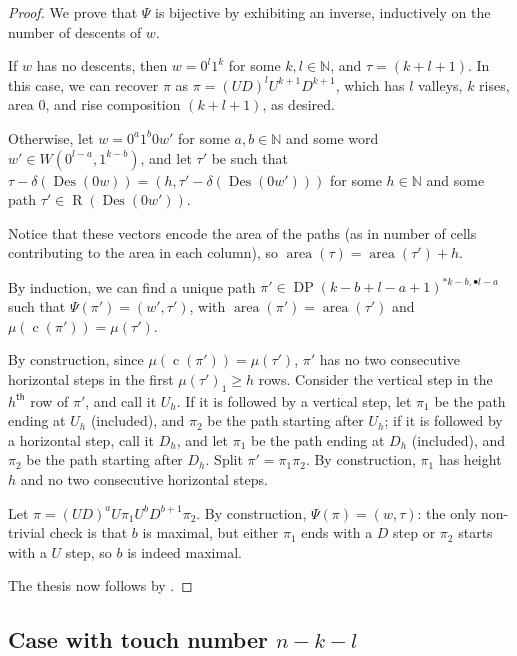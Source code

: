 \documentclass[reqno]{amsart}
\theoremstyle{plain}
\theoremstyle{definition}
\theoremstyle{remark}
\renewcommand{\th}{^\mathsf{th}}
\DeclareMathOperator{\R}{R}
\DeclareMathOperator{\DP}{DP}
\DeclareMathOperator{\area}{area}
\DeclareMathOperator{\Des}{Des}
\DeclareMathOperator{\cc}{c}
\newcommand{\<}{\langle}
\renewcommand{\>}{\rangle}
\begin{document}
\begin{proof}
    We prove that $\Psi$ is bijective by exhibiting an inverse, inductively on the number of descents of $w$.
    
    If $w$ has no descents, then $w = 0^l 1^k$ for some $k,l \in \mathbb{N}$, and $\tau = (k+l+1)$. In this case, we can recover $\pi$ as $\pi = (UD)^l U^{k+1} D^{k+1}$, which has $l$ valleys, $k$ rises, area $0$, and rise composition $(k+l+1)$, as desired.

    Otherwise, let $w = 0^a 1^b 0 w'$ for some $a,b \in \mathbb{N}$ and some word $w' \in W \left(0^{l-a},1^{k-b}\right)$, and let $\tau'$ be such that $\tau - \delta(\Des(0w)) = (h, \tau' - \delta(\Des(0w')))$ for some $h \in \mathbb{N}$ and some path $\tau' \in \R(\Des(0w'))$. 

    Notice that these vectors encode the area of the paths (as in number of cells contributing to the area in each column), so $\area(\tau) = \area(\tau') + h$.

    By induction, we can find a unique path $\pi' \in \DP(k-b+l-a+1)^{\ast k-b, \bullet l-a}$ such that $\Psi(\pi') = (w',\tau')$, with $\area(\pi') = \area(\tau')$ and $\mu(\cc(\pi')) = \mu(\tau')$.

    By construction, since $\mu(\cc(\pi')) = \mu(\tau')$, $\pi'$ has no two consecutive horizontal steps in the first $\mu(\tau')_1 \geq h$ rows. Consider the vertical step in the $h\th$ row of $\pi'$, and call it $U_h$. If it is followed by a vertical step, let $\pi_1$ be the path ending at $U_h$ (included), and $\pi_2$ be the path starting after $U_h$; if it is followed by a horizontal step, call it $D_h$, and let $\pi_1$ be the path ending at $D_h$ (included), and $\pi_2$ be the path starting after $D_h$. Split $\pi' = \pi_1 \pi_2$. By construction, $\pi_1$ has height $h$ and no two consecutive horizontal steps.

    Let $\pi = (UD)^a U \pi_1 U^b D^{b+1} \pi_2$. By construction, $\Psi(\pi) = (w, \tau)$: the only non-trivial check is that $b$ is maximal, but either $\pi_1$ ends with a $D$ step or $\pi_2$ starts with a $U$ step, so $b$ is indeed maximal.

    The thesis now follows by .
\end{proof}


\subsection{Case with touch number \texorpdfstring{$n-k-l$}{n-k-l}}
\end{document}
